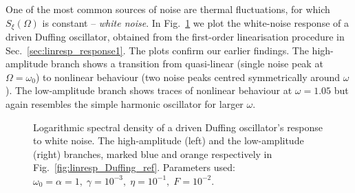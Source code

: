One of the most common sources of noise are thermal fluctuations, for which $S_{\xi}(\Omega)$ is constant -- \textit{white noise}. In Fig.~\ref{fig:linresp_noise} we plot the white-noise response of a driven Duffing oscillator, obtained from the first-order linearisation procedure in Sec.~\ref{sec:linresp_response1}. The plots confirm our earlier findings. The high-amplitude branch shows a transition from quasi-linear (single noise peak at $\Omega=\omega_0$) to nonlinear behaviour (two noise peaks centred symmetrically around $\omega$). The low-amplitude branch shows traces of nonlinear behaviour at $\omega=1.05$ but again resembles the simple harmonic oscillator for larger $\omega$. 
%
\begin{figure} [h!]
	\centering
	
	\caption{Logarithmic spectral density of a driven Duffing oscillator's response to white noise. The high-amplitude (left) and the low-amplitude (right) branches, marked blue and orange respectively in Fig.~\ref{fig:linresp_Duffing_ref}. Parameters used: $\omega_0 = \alpha = 1, \; \gamma = 10^{-3} , \; \eta = 10^{-1},\; F = 10^{-2}$.}
	\label{fig:linresp_noise}
\end{figure}
%
